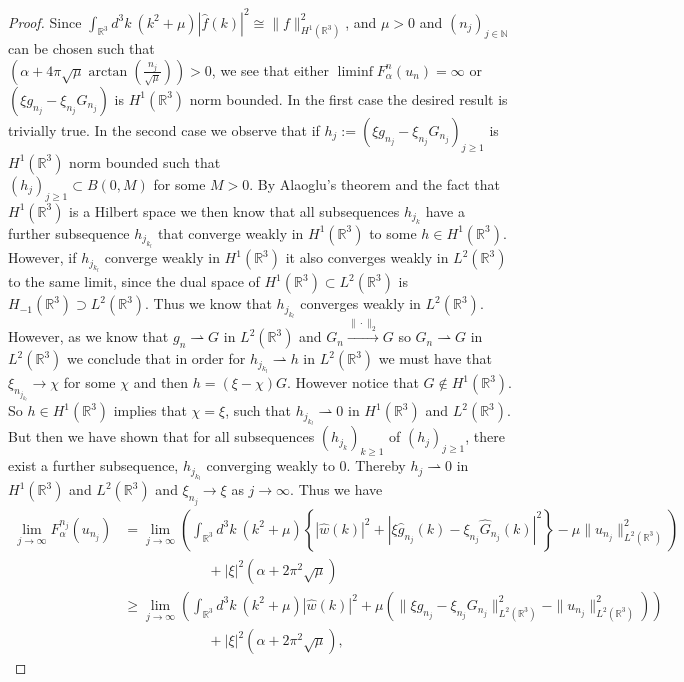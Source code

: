 \documentclass[a4paper,11pt]{article}
\newcommand{\R}{\mathbb{R}}
\numberwithin{equation}{section}
\begin{document}
\begin{proof}
Since $ \int_{\R^3} d^3k\ \left(k^2+\mu\right)|\hat{f}(k)|^2\cong \|f\|_{H^1(\R^3)}^2 $, and $ \mu>0 $ and $ (n_j)_{j\in\mathbb{N}} $ can be chosen such that\\ $ \left(\alpha+4\pi\sqrt{\mu}\arctan\left(\frac{n_j}{\sqrt{\mu}}\right)\right)>0 $, we see that either $ \liminf F_\alpha^{n}(u_{n})=\infty $ or $ (\xi g_{n_j}-\xi_{n_j}G_{n_j}) $ is $ H^1(\R^3) $ norm bounded. In the first case the desired result is trivially true. In the second case we observe that if $ h_j:=(\xi g_{n_j}-\xi_{n_j}G_{n_j})_{j\geq1} $ is $ H^1(\R^3) $ norm bounded such that \\$ (h_j)_{j\geq1}\subset B(0,M) $ for some $ M>0 $. By Alaoglu's theorem and the fact that $ H^1(\R^3) $ is a Hilbert space we then know that all subsequences $ h_{j_k} $ have a further subsequence $ h_{j_{k_l}} $ that converge weakly in $ H^1(\R^3) $ to some $ h\in H^1(\R^3) $. However, if $ h_{j_{k_l}} $ converge weakly in $ H^1(\R^3) $ it also converges weakly in $ L^2(\R^3) $ to the same limit, since the dual space of $ H^1(\R^3) \subset L^2(\R^3) $ is $ H_{-1}(\R^3) \supset L^2(\R^3) $. Thus we know that $ h_{j_{k_l}} $ converges weakly in $ L^2(\R^3) $. However, as we know that $ g_n\rightharpoonup G $ in $ L^2(\R^3) $ and $ G_n\xrightarrow{\|\cdot\|_2} G $ so $ G_n\rightharpoonup G $ in $ L^2(\R^3) $ we conclude that in order for $ h_{j_{k_l}}\rightharpoonup h $ in $ L^2(\R^3) $ we must have that $ \xi_{n_{j_{k_l}}}\to\chi $ for some $ \chi $ and then $ h=(\xi-\chi)G $. However notice that $ G\notin H^1(\R^3) $. So $ h\in H^1(\R^3) $ implies that $ \chi=\xi $, such that $ h_{j_{k_l}}\rightharpoonup0 $ in $ H^1(\R^3) $ and $ L^2(\R^3) $. But then we have shown that for all subsequences $ (h_{j_k})_{k\geq1} $ of $ (h_j)_{j\geq1} $, there exist a further subsequence, $ h_{j_{k_l}} $ converging weakly to $ 0 $. Thereby $ h_j\rightharpoonup 0 $ in $ H^1(\R^3) $ and $ L^2(\R^3) $ and $ \xi_{n_j}\to\xi $ as $ j\to\infty $. Thus we have 
\begin{equation}
\begin{aligned}
\lim\limits_{j\to\infty}F_\alpha^{n_j}(u_{n_j})&=\lim\limits_{j\to\infty}\left(\int_{\R^3} d^3k\ \left(k^2+\mu\right)\left\{|\hat{w}(k)|^2+|\xi \hat{g}_{n_j}(k)-\xi_{n_j}\hat{G}_{n_j}(k)|^2\right\}-\mu\|u_{n_j}\|^2_{L^2(\R^3)}\right)\\&\qquad\qquad\qquad+|\xi|^2\left(\alpha+2\pi^2\sqrt{\mu}\right)\\
&\geq\lim\limits_{j\to\infty}\left(\int_{\R^3} d^3k\ \left(k^2+\mu\right)|\hat{w}(k)|^2+\mu(\|\xi g_{n_j}-\xi_{n_j}G_{n_j}\|^2_{L^2(\R^3)}-\|u_{n_j}\|^2_{L^2(\R^3)})\right)\\&\qquad\qquad\qquad+|\xi|^2\left(\alpha+2\pi^2\sqrt{\mu}\right),

\end{aligned}
\end{equation}
\end{proof}
\end{document}
